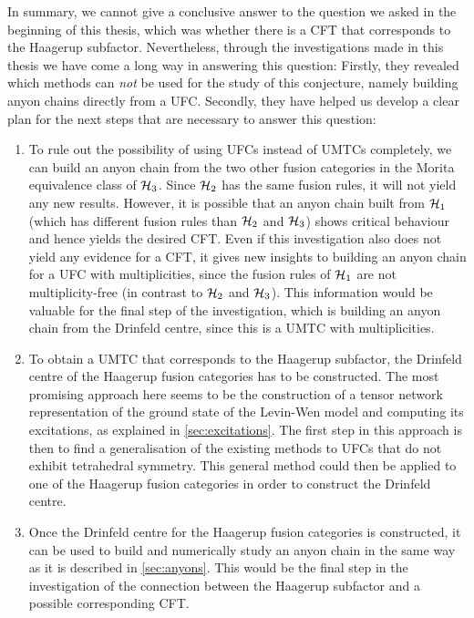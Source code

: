 In summary, we cannot give a conclusive answer to the question we asked in the beginning of this thesis, which was whether there is a CFT that corresponds to the Haagerup subfactor. Nevertheless, through the investigations made in this thesis we have come a long way in answering this question: Firstly, they revealed which methods can \emph{not} be used for the study of this conjecture, namely building anyon chains directly from a UFC. Secondly, they have helped us develop a clear plan for the next steps that are necessary to answer this question:
	\begin{enumerate}
		\item To rule out the possibility of using UFCs instead of UMTCs completely, we can build an anyon chain from the two other fusion categories in the Morita equivalence class of ${\mathcal{H}_3}$. Since ${\mathcal{H}}_2$ has the same fusion rules, it will not yield any new results. However, it is possible that an anyon chain built from ${\mathcal{H}}_1$ (which has different fusion rules than ${\mathcal{H}}_2$ and ${\mathcal{H}_3}$) shows critical behaviour and hence yields the desired CFT. Even if this investigation also does not yield any evidence for a CFT, it gives new insights to building an anyon chain for a UFC with multiplicities, since the fusion rules of ${\mathcal{H}}_1$ are not multiplicity-free (in contrast to ${\mathcal{H}}_2$ and ${\mathcal{H}_3}$). This information would be valuable for the final step of the investigation, which is building an anyon chain from the Drinfeld centre, since this is a UMTC with multiplicities.
		\item To obtain a UMTC that corresponds to the Haagerup subfactor, the Drinfeld centre of the Haagerup fusion categories has to be constructed. The most promising approach here seems to be the construction of a tensor network representation of the ground state of the Levin-Wen model and computing its excitations, as explained in \cref{sec:excitations}. The first step in this approach is then to find a generalisation of the existing methods to UFCs that do not exhibit tetrahedral symmetry. This general method could then be applied to one of the Haagerup fusion categories in order to construct the Drinfeld centre.
		\item Once the Drinfeld centre for the Haagerup fusion categories is constructed, it can be used to build and numerically study an anyon chain in the same way as it is described in \cref{sec:anyons}. This would be the final step in the investigation of the connection between the Haagerup subfactor and a possible corresponding CFT.
	\end{enumerate}

